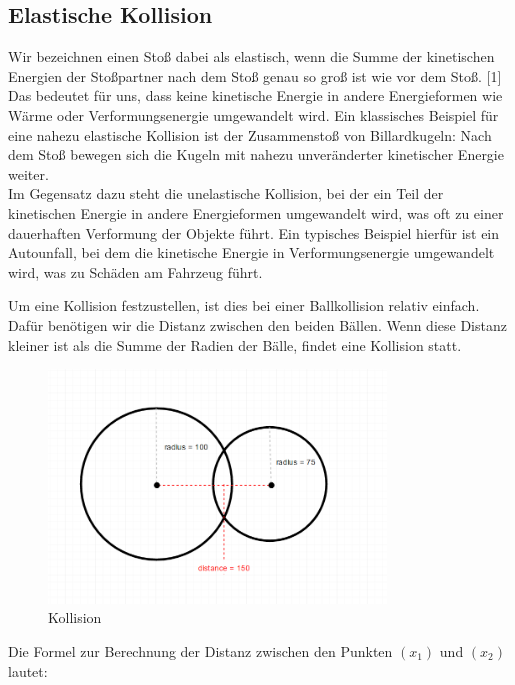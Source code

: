 \documentclass[12pt,a4paper]{article}
\begin{document}
	\subsection{Elastische Kollision}	
	Wir bezeichnen einen Stoß dabei als elastisch, wenn die Summe der kinetischen Energien der Stoßpartner nach dem Stoß genau so groß ist wie vor dem Stoß. [1] \\
	Das bedeutet für uns, dass keine kinetische Energie in andere Energieformen wie Wärme oder Verformungsenergie umgewandelt wird. Ein klassisches Beispiel für eine nahezu elastische Kollision ist der Zusammenstoß von Billardkugeln: Nach dem Stoß bewegen sich die Kugeln mit nahezu unveränderter kinetischer Energie weiter.\\ Im Gegensatz dazu steht die unelastische Kollision, bei der ein Teil der kinetischen Energie in andere Energieformen umgewandelt wird, was oft zu einer dauerhaften Verformung der Objekte führt. Ein typisches Beispiel hierfür ist ein Autounfall, bei dem die kinetische Energie in Verformungsenergie umgewandelt wird, was zu Schäden am Fahrzeug führt.
	
	\vspace{0.5cm}
	
Um eine Kollision festzustellen, ist dies bei einer Ballkollision relativ einfach. Dafür benötigen wir die Distanz zwischen den beiden Bällen. Wenn diese Distanz kleiner ist als die Summe der Radien der Bälle, findet eine Kollision statt.

\begin{figure}[H]
	\centering 
	\includegraphics[width=0.8\textwidth]{collision-detection-6.png}  
	\caption{Kollision} 
	\label{Bild: Kollision}  
\end{figure}

\newpage

Die Formel zur Berechnung der Distanz zwischen den Punkten \( (x_1) \) und \( (x_2) \) lautet:
\end{document}
